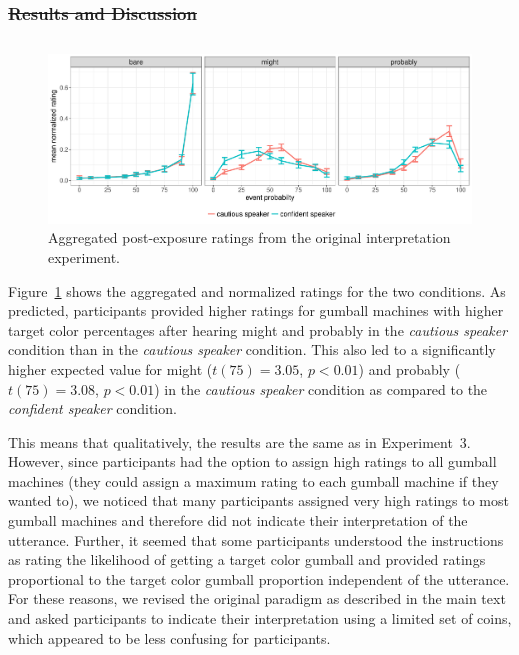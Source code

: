 \documentclass[man, floatsintext]{apa6}
\providecommand{\DIFadd}[1]{{\protect\color{blue}\uwave{#1}}} %
\providecommand{\DIFdel}[1]{{\protect\color{red}\sout{#1}}}                      %
\providecommand{\DIFaddbegin}{} %
\providecommand{\DIFaddend}{} %
\providecommand{\DIFdelbegin}{} %
\providecommand{\DIFdelend}{} %
\newcommand{\DIFscaledelfig}{0.5}
\newlength{\DIFdelgraphicswidth} %
\newlength{\DIFdelgraphicsheight} %
\newcommand{\DIFaddincludegraphics}[2][]{{\color{blue}\fbox{\DIFOincludegraphics[#1]{#2}}}} %
\newcommand{\DIFdelincludegraphics}[2][]{%
\sbox{\DIFdelgraphicsbox}{\DIFOincludegraphics[#1]{#2}}%
\settoboxwidth{\DIFdelgraphicswidth}{\DIFdelgraphicsbox} %
\settoboxtotalheight{\DIFdelgraphicsheight}{\DIFdelgraphicsbox} %
\scalebox{\DIFscaledelfig}{%
\parbox[b]{\DIFdelgraphicswidth}{\usebox{\DIFdelgraphicsbox}\\[-\baselineskip] \rule{\DIFdelgraphicswidth}{0em}}\llap{\resizebox{\DIFdelgraphicswidth}{\DIFdelgraphicsheight}{%
\setlength{\unitlength}{\DIFdelgraphicswidth}%
\begin{picture}(1,1)%
\thicklines\linethickness{2pt} %
{\color[rgb]{1,0,0}\put(0,0){\framebox(1,1){}}}%
{\color[rgb]{1,0,0}\put(0,0){\line( 1,1){1}}}%
{\color[rgb]{1,0,0}\put(0,1){\line(1,-1){1}}}%
\end{picture}%
}\hspace*{3pt}}} %
} %
\DeclareRobustCommand{\DIFaddbegin}{\DIFOaddbegin \let\includegraphics\DIFaddincludegraphics} %
\DeclareRobustCommand{\DIFaddend}{\DIFOaddend \let\includegraphics\DIFOincludegraphics} %
\DeclareRobustCommand{\DIFdelbegin}{\DIFOdelbegin \let\includegraphics\DIFdelincludegraphics} %
\DeclareRobustCommand{\DIFdelend}{\DIFOaddend \let\includegraphics\DIFOincludegraphics} %
\begin{document}
\DIFdelbegin \subsubsection*{\DIFdel{Results and Discussion}}
\DIFdelend \DIFaddbegin \subsection{\DIFadd{Results and Discussion}}
\DIFaddend 

\begin{figure}[h!]
\includegraphics[width=\textwidth]{plots/exp-2-ratings-orig.pdf}
\caption{Aggregated post-exposure ratings from the original interpretation experiment.  \label{fig:adaptation-results-comp-orig}}
\end{figure}

Figure~\ref{fig:adaptation-results-comp-orig} shows the aggregated and normalized ratings for the two conditions.  As predicted, participants provided higher ratings for gumball machines with higher target color percentages after hearing {\sc might} and {\sc probably} in the \emph{cautious speaker} condition than in the \emph{cautious speaker} condition. This also led to a significantly higher expected value for {\sc might} ($t(75)=3.05$, $p<0.01$) and {\sc probably} ($t(75)=3.08$, $p<0.01$) in the \emph{cautious speaker} condition as compared to the \emph{confident speaker} condition.

This means that qualitatively, the results are the same as in Experiment~3. However, since participants had the option to assign high 
ratings to 
all gumball machines (they could assign a maximum rating to each gumball machine if they wanted to), we noticed that many participants assigned very high ratings to most gumball 
machines and therefore did not indicate their interpretation of the utterance. Further, it seemed that some participants
understood the instructions as rating the likelihood of getting a target color gumball and provided ratings proportional to the 
target color gumball proportion independent of the utterance. For these reasons, we revised the original paradigm as described
in the main text and asked participants to indicate their interpretation using a limited set of coins, which appeared to be less
confusing for participants. 
\end{document}
